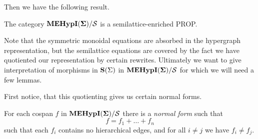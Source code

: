 Then we have the following result. 
\begin{proposition}[Soundness]
\label{prop:soundness}
The category ${\mathbf{MEHypI(\Sigma)}}/{\mathcal{S}}$ is a semilattice-enriched PROP. 
\end{proposition}
Note that the symmetric monoidal equations are absorbed in the hypergraph representation,  but the semilattice equations are covered by the fact we have quotiented our representation by certain rewrites. 
Ultimately we want to give interpretation of morphisms in $\mathbf{S}(\Sigma)$ in ${\mathbf{MEHypI(\Sigma)}} / \mathcal{S}$ for which we will need a few lemmas.

First notice, that this quotienting gives us certain normal forms.

\begin{lemma}
\label{lemma:normal_form}
For each cospan $f$ in ${{\mathbf{MEHypI(\Sigma)}}}/{\mathcal{S}}$ there is a \textit{normal form} such that 
\[
	f = f_1 + \ldots + f_n
\]
	such that each $f_i$ contains no hierarchical edges,  and for all $i \neq j$ we have $f_i \neq f_j$.
\end{lemma}


